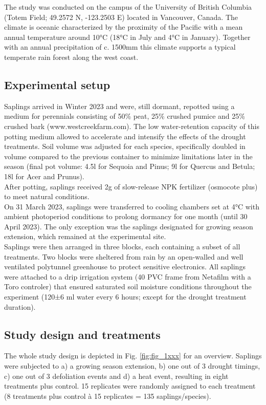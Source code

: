 \documentclass{article}
\begin{document}
	The study was conducted on the campus of the University of British Columbia (Totem Field; 49.2572 N, -123.2503 E) located in Vancouver, Canada. The climate is oceanic characterized by the proximity of the Pacific with a mean annual temperature around 10°C (18°C in July and 4°C in January). Together with an annual precipitation of c. 1500mm this climate supports a typical temperate rain forest along the west coast.
	
	\subsection*{Experimental setup}
		
	Saplings arrived in Winter 2023 and were, still dormant, repotted using a medium for perennials consisting of 50\% peat, 25\% crushed pumice and 25\% crushed bark (www.westcreekfarm.com). The low water-retention capacity of this potting medium allowed to accelerate and intensify the effects of the drought treatments. Soil volume was adjusted for each species, specifically doubled in volume compared to the previous container to minimize limitations later in the season (final pot volume: 4.5l for Sequoia and Pinus; 9l for Quercus and Betula; 18l for Acer and Prunus). \\ 
	After potting, saplings received 2g of slow-release NPK fertilizer (osmocote plus) to meet natural conditions. \\ 
	On 31 March 2023, saplings were transferred to cooling chambers set at 4°C with ambient photoperiod conditions to prolong dormancy for one month (until 30 April 2023). The only exception was the saplings designated for growing season extension, which remained at the experimental site. \\ 
	Saplings were then arranged in three blocks, each containing a subset of all treatments. Two blocks were sheltered from rain by an open-walled and well ventilated polytunnel greenhouse to protect sensitive electronics. All saplings were attached to a drip irrigation system (40 PVC frame from Netafilm with a Toro controler) that ensured saturated soil moisture conditions throughout the experiment (120±6 ml water every 6 hours;  except for the drought treatment duration). \\ 
	
		\subsection*{Study design and treatments}
	The whole study design is depicted in Fig. \ref{fig:fig_1xxx} for an overview. Saplings were subjected to a) a growing season extension, b) one out of 3 drought timings, c) one out of 3 defoliation events and d) a heat event, resulting in eight treatments plus control. 15 replicates were randomly assigned to each treatment (8 treatments plus control à 15 replicates = 135 saplings/species). \\  
	
\end{document}
